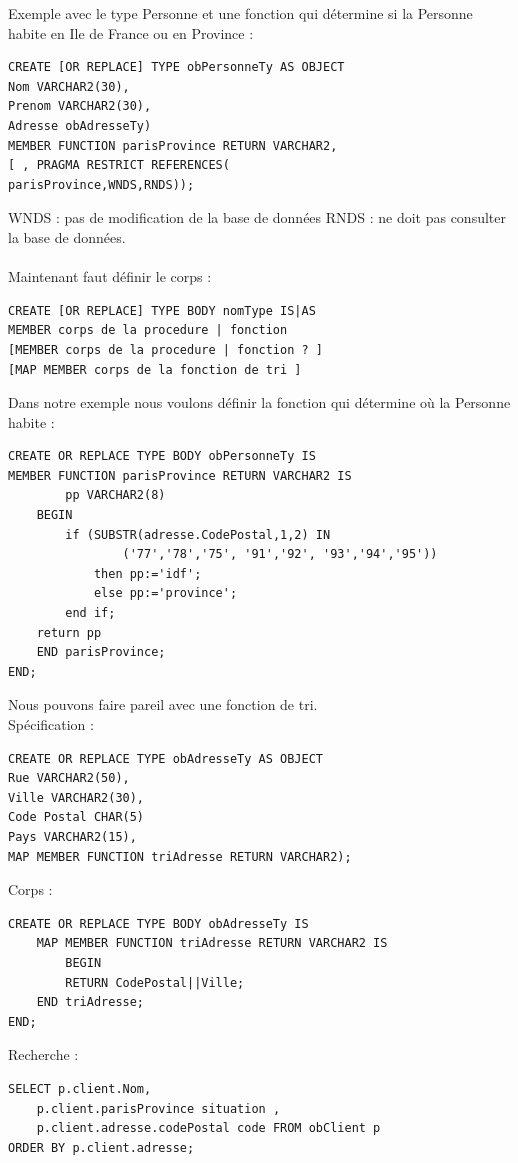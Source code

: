 \documentclass{report}
\begin{document}
Exemple avec le type Personne et une fonction qui détermine si la Personne habite en Ile de France ou en Province :
\begin{lstlisting}[style=MySQLStyle]
CREATE [OR REPLACE] TYPE obPersonneTy AS OBJECT
Nom VARCHAR2(30),
Prenom VARCHAR2(30),
Adresse obAdresseTy)
MEMBER FUNCTION parisProvince RETURN VARCHAR2,
[ , PRAGMA RESTRICT REFERENCES(
parisProvince,WNDS,RNDS));
\end{lstlisting}
WNDS : pas de modification de la base de données
RNDS : ne doit pas consulter la base de données. \\ \\

Maintenant faut définir le corps :
\begin{lstlisting}[style=MySQLStyle]
CREATE [OR REPLACE] TYPE BODY nomType IS|AS
MEMBER corps de la procedure | fonction
[MEMBER corps de la procedure | fonction ? ]
[MAP MEMBER corps de la fonction de tri ]
\end{lstlisting}

Dans notre exemple nous voulons définir la fonction qui détermine où la Personne habite :
\begin{lstlisting}[style=MySQLStyle]
CREATE OR REPLACE TYPE BODY obPersonneTy IS
MEMBER FUNCTION parisProvince RETURN VARCHAR2 IS
		pp VARCHAR2(8)
	BEGIN
		if (SUBSTR(adresse.CodePostal,1,2) IN
				('77','78','75', '91','92', '93','94','95'))
			then pp:='idf';
			else pp:='province';
		end if;
	return pp
	END parisProvince;
END;
\end{lstlisting}

Nous pouvons faire pareil avec une fonction de tri.\\
Spécification :
\begin{lstlisting}[style=MySQLStyle]
CREATE OR REPLACE TYPE obAdresseTy AS OBJECT
Rue VARCHAR2(50),
Ville VARCHAR2(30),
Code Postal CHAR(5)
Pays VARCHAR2(15),
MAP MEMBER FUNCTION triAdresse RETURN VARCHAR2);
\end{lstlisting}

Corps :
\begin{lstlisting}[style=MySQLStyle]
CREATE OR REPLACE TYPE BODY obAdresseTy IS
	MAP MEMBER FUNCTION triAdresse RETURN VARCHAR2 IS
		BEGIN
		RETURN CodePostal||Ville;
	END triAdresse;
END;
\end{lstlisting}

Recherche :
\begin{lstlisting}[style=MySQLStyle]
SELECT p.client.Nom,
	p.client.parisProvince situation ,
	p.client.adresse.codePostal code FROM obClient p
ORDER BY p.client.adresse;
\end{lstlisting}
\end{document}
